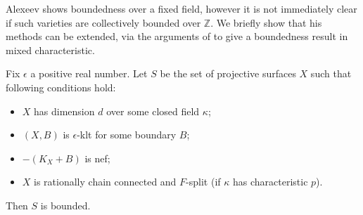 \documentclass[a4paper,12pt]{book}
\begin{document}
	Alexeev shows boundedness over a fixed field, however it is not immediately clear if such varieties are collectively bounded over $\mathbb{Z}$. We briefly show that his methods can be extended, via the arguments of \cite{witaszek2015effective} to give a boundedness result in mixed characteristic.
	
	\begin{theorem}\label{SBAB}
			Fix $\epsilon$ a positive real number. Let $S$ be the set of projective surfaces $X$ such that following conditions hold:
		\begin{itemize}
			\item $X$ has dimension $d$ over some closed field $\kappa$;
			\item $(X,B)$ is $\epsilon$-klt for some boundary $B$;
			\item $-(K_{X}+B)$ is nef;
			\item $X$ is rationally chain connected and $F$-split (if $\kappa$ has characteristic $p$).
		\end{itemize}
		Then $S$ is bounded.
	\end{theorem}
\end{document}
